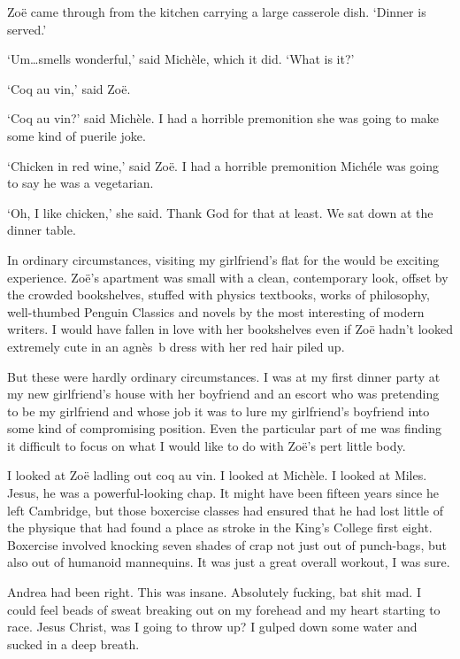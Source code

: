 Zoë came through from the kitchen carrying a large casserole
dish. `Dinner is served.'

`Um\dots smells wonderful,' said Michèle, which it did. `What is
it?'

`Coq au vin,' said Zoë.

`Coq au vin?' said Michèle. I had a horrible premonition she was
going to make some kind of puerile joke.

`Chicken in red wine,' said Zoë. I had a horrible premonition
Michéle was going to say he was a vegetarian.

`Oh, I like chicken,' she said. Thank God for that at least. We sat
down at the dinner table.

In ordinary circumstances, visiting my girlfriend's flat for the
would be exciting experience. Zoë's apartment was small with a
clean, contemporary look, offset by the crowded bookshelves, stuffed
with physics textbooks, works of philosophy, well-thumbed Penguin
Classics and novels by the most interesting of modern writers. I
would have fallen in love with her bookshelves even if Zoë
hadn't looked extremely cute in an agnès~b dress with her red
hair piled up.

But these were hardly ordinary circumstances. I was at my first
dinner party at my new girlfriend's house with her boyfriend and an
escort who was pretending to be my girlfriend and whose job it was
to lure my girlfriend's boyfriend into some kind of compromising
position. Even the particular part of me was finding it difficult to
focus on what I would like to do with Zoë's pert little body.

I looked at Zoë ladling out coq au vin. I looked at Michèle.
I looked at Miles. Jesus, he was a powerful-looking chap. It might
have been fifteen years since he left Cambridge, but those boxercise classes had ensured that he had lost
little of the physique that had found a place as stroke in the
King's College first eight. Boxercise
involved knocking seven shades of crap not just out of punch-bags,
but also out of humanoid mannequins. It was just a great overall workout,
I was sure.

Andrea had been right. This was insane. Absolutely fucking, bat shit
mad. I could feel beads of sweat breaking out on my forehead and my
heart starting to race. Jesus Christ, was I going to throw up? I
gulped down some water and sucked in a deep breath.

